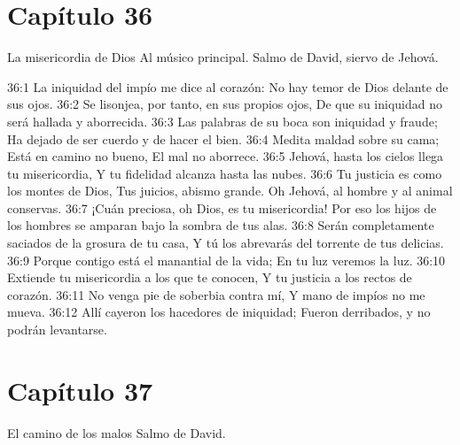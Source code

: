 \section*{Capítulo 36}
La misericordia de Dios 
Al músico principal. Salmo de David, siervo de Jehová. 
 
36:1 La iniquidad del impío me dice al corazón: 
No hay temor de Dios delante de sus ojos. 
36:2 Se lisonjea, por tanto, en sus propios ojos, 
De que su iniquidad no será hallada y aborrecida. 
36:3 Las palabras de su boca son iniquidad y fraude; 
Ha dejado de ser cuerdo y de hacer el bien. 
36:4 Medita maldad sobre su cama; 
Está en camino no bueno, 
El mal no aborrece. 
36:5 Jehová, hasta los cielos llega tu misericordia, 
Y tu fidelidad alcanza hasta las nubes. 
36:6 Tu justicia es como los montes de Dios, 
Tus juicios, abismo grande. 
Oh Jehová, al hombre y al animal conservas. 
36:7 ¡Cuán preciosa, oh Dios, es tu misericordia! 
Por eso los hijos de los hombres se amparan bajo la sombra de tus alas. 
36:8 Serán completamente saciados de la grosura de tu casa, 
Y tú los abrevarás del torrente de tus delicias. 
36:9 Porque contigo está el manantial de la vida; 
En tu luz veremos la luz. 
36:10 Extiende tu misericordia a los que te conocen, 
Y tu justicia a los rectos de corazón. 
36:11 No venga pie de soberbia contra mí, 
Y mano de impíos no me mueva. 
36:12 Allí cayeron los hacedores de iniquidad; 
Fueron derribados, y no podrán levantarse. 
\section*{Capítulo 37}
El camino de los malos 
Salmo de David. 
 
